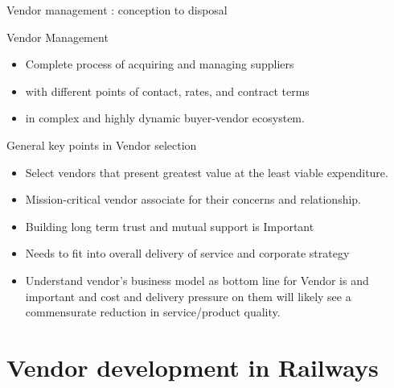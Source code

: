 \documentclass[
  10pt,
  ignorenonframetext,
  aspectratio=43,
]{beamer}
\providecommand{\tightlist}{%
  \setlength{\itemsep}{0pt}\setlength{\parskip}{0pt}}
\begin{document}
\begin{frame}{Vendor management : conception to disposal}
\protect\hypertarget{vendor-management-conception-to-disposal}{}
\begin{block}{Vendor Management}
\protect\hypertarget{vendor-management}{}
\begin{itemize}
\tightlist
\item
  Complete process of acquiring and managing suppliers
\item
  with different points of contact, rates, and contract terms
\item
  in complex and highly dynamic buyer-vendor ecosystem.
\end{itemize}
\end{block}

\begin{block}{General key points in Vendor selection}
\protect\hypertarget{general-key-points-in-vendor-selection}{}
\begin{itemize}
\tightlist
\item
  Select vendors that present greatest value at the least viable
  expenditure.
\item
  Mission-critical vendor associate for their concerns and relationship.
\item
  Building long term trust and mutual support is Important
\item
  Needs to fit into overall delivery of service and corporate strategy
\item
  Understand vendor's business model as bottom line for Vendor is and
  important and cost and delivery pressure on them will likely see a
  commensurate reduction in service/product quality.
\end{itemize}
\end{block}
\end{frame}

\hypertarget{vendor-development-in-railways}{%
\section{Vendor development in
Railways}\label{vendor-development-in-railways}}
\end{document}
